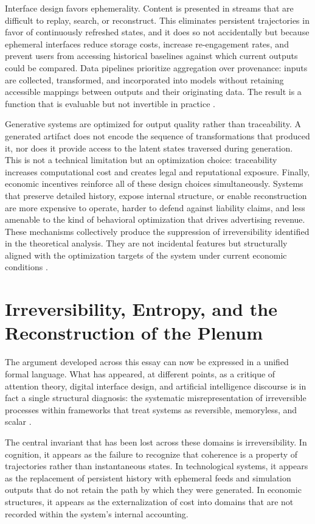 \documentclass[12pt, a4paper]{article}
\begin{document}
Interface design favors ephemerality. Content is presented in streams that are difficult to replay, search, or reconstruct. This eliminates persistent trajectories in favor of continuously refreshed states, and it does so not accidentally but because ephemeral interfaces reduce storage costs, increase re-engagement rates, and prevent users from accessing historical baselines against which current outputs could be compared. Data pipelines prioritize aggregation over provenance: inputs are collected, transformed, and incorporated into models without retaining accessible mappings between outputs and their originating data. The result is a function that is evaluable but not invertible in practice \cite{Shannon1948}.

Generative systems are optimized for output quality rather than traceability. A generated artifact does not encode the sequence of transformations that produced it, nor does it provide access to the latent states traversed during generation. This is not a technical limitation but an optimization choice: traceability increases computational cost and creates legal and reputational exposure. Finally, economic incentives reinforce all of these design choices simultaneously. Systems that preserve detailed history, expose internal structure, or enable reconstruction are more expensive to operate, harder to defend against liability claims, and less amenable to the kind of behavioral optimization that drives advertising revenue. These mechanisms collectively produce the suppression of irreversibility identified in the theoretical analysis. They are not incidental features but structurally aligned with the optimization targets of the system under current economic conditions \cite{Goodhart1975,Zuboff2019}.

\section{Irreversibility, Entropy, and the Reconstruction of the Plenum}

The argument developed across this essay can now be expressed in a unified formal language. What has appeared, at different points, as a critique of attention theory, digital interface design, and artificial intelligence discourse is in fact a single structural diagnosis: the systematic misrepresentation of irreversible processes within frameworks that treat systems as reversible, memoryless, and scalar \cite{Prigogine1984,Landauer1961}.

The central invariant that has been lost across these domains is irreversibility. In cognition, it appears as the failure to recognize that coherence is a property of trajectories rather than instantaneous states. In technological systems, it appears as the replacement of persistent history with ephemeral feeds and simulation outputs that do not retain the path by which they were generated. In economic structures, it appears as the externalization of cost into domains that are not recorded within the system's internal accounting.
\end{document}
